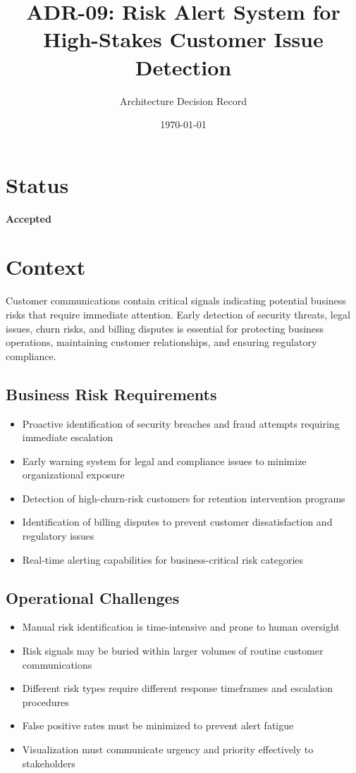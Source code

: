 \documentclass[11pt]{article}
\title{\textbf{ADR-09: Risk Alert System for High-Stakes Customer Issue Detection}}
\author{Architecture Decision Record}
\date{\today}
\begin{document}
\maketitle

\section{Status}
\textbf{Accepted}

\section{Context}

Customer communications contain critical signals indicating potential business risks that require immediate attention. Early detection of security threats, legal issues, churn risks, and billing disputes is essential for protecting business operations, maintaining customer relationships, and ensuring regulatory compliance.

\subsection{Business Risk Requirements}
\begin{itemize}
\item Proactive identification of security breaches and fraud attempts requiring immediate escalation
\item Early warning system for legal and compliance issues to minimize organizational exposure
\item Detection of high-churn-risk customers for retention intervention programs
\item Identification of billing disputes to prevent customer dissatisfaction and regulatory issues
\item Real-time alerting capabilities for business-critical risk categories
\end{itemize}

\subsection{Operational Challenges}
\begin{itemize}
\item Manual risk identification is time-intensive and prone to human oversight
\item Risk signals may be buried within larger volumes of routine customer communications
\item Different risk types require different response timeframes and escalation procedures
\item False positive rates must be minimized to prevent alert fatigue
\item Visualization must communicate urgency and priority effectively to stakeholders
\end{itemize}
\end{document}
